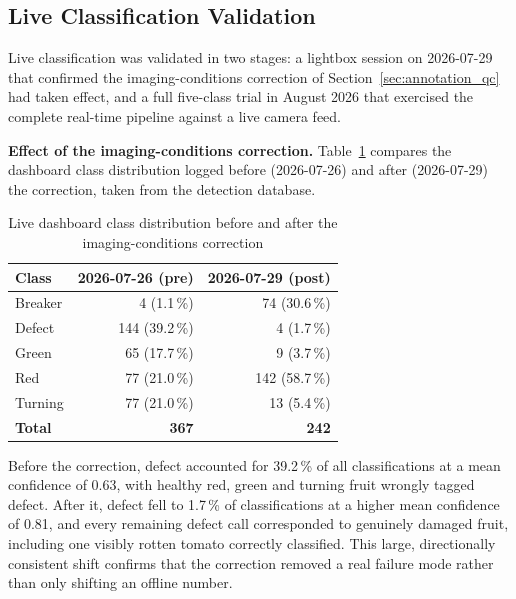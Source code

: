 \subsection{Live Classification Validation}
\label{sec:r_live}

Live classification was validated in two stages: a lightbox session on 2026-07-29 that confirmed the imaging-conditions correction of Section~\ref{sec:annotation_qc} had taken effect, and a full five-class trial in August 2026 that exercised the complete real-time pipeline against a live camera feed.

\textbf{Effect of the imaging-conditions correction.} Table~\ref{tab:liveclass} compares the dashboard class distribution logged before (2026-07-26) and after (2026-07-29) the correction, taken from the detection database.

\begin{table}[H]
\caption{Live dashboard class distribution before and after the imaging-conditions correction}
\label{tab:liveclass}
\centering
\begin{tabular}{lrr}
\toprule
\textbf{Class} & \textbf{2026-07-26 (pre)} & \textbf{2026-07-29 (post)} \\
\midrule
Breaker & 4 (1.1\,\%)   & 74 (30.6\,\%) \\
Defect  & 144 (39.2\,\%) & 4 (1.7\,\%) \\
Green   & 65 (17.7\,\%)  & 9 (3.7\,\%) \\
Red     & 77 (21.0\,\%)  & 142 (58.7\,\%) \\
Turning & 77 (21.0\,\%)  & 13 (5.4\,\%) \\
\midrule
\textbf{Total} & \textbf{367} & \textbf{242} \\
\bottomrule
\end{tabular}
\end{table}

Before the correction, defect accounted for 39.2\,\% of all classifications at a mean confidence of 0.63, with healthy red, green and turning fruit wrongly tagged defect. After it, defect fell to 1.7\,\% of classifications at a higher mean confidence of 0.81, and every remaining defect call corresponded to genuinely damaged fruit, including one visibly rotten tomato correctly classified. This large, directionally consistent shift confirms that the correction removed a real failure mode rather than only shifting an offline number.

